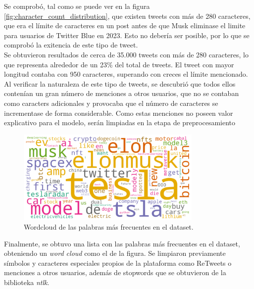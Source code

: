 \documentclass[a4paper, 12pt]{report}
\begin{document}
                        Se comprobó, tal como se puede ver en la figura \ref{fig:character_count_distribution}, 
                        que existen tweets con más de 280 caracteres, que era el límite de caracteres en un post antes de que Musk
                        eliminase el limite para usuarios de Twitter Blue en 2023. Esto no debería ser posible, por lo que se comprobó la exitencia de este tipo de tweet.\\

                        Se obtuvieron resultados de cerca de 35.000 tweets con más de 280 caracteres, lo que representa alrededor de un 23\% del total de tweets.
                        El tweet con mayor longitud contaba con 950 caracteres, superando con creces el límite mencionado. Al verificar la naturaleza de este tipo de tweets,
                        se descubrió que todos ellos contenían un gran número de menciones a otros usuarios, que no se contaban como caracters adicionales y provocaba que el número de caracteres se incrementase de forma considerable. Como 
                        estas menciones no poseen valor explicativo para el modelo, serán limpiadas en la etapa de preprocesamiento\\

                        \begin{figure}[H]
                                \centering
                                \includegraphics[width=0.8\textwidth]{resources/images/word_cloud.png}
                                \caption{Wordcloud de las palabras más frecuentes en el dataset.}
                                \label{fig:wordcloud}
                        \end{figure}

                        Finalmente, se obtuvo una lista con las palabras más frecuentes en el dataset, obteniendo un \textit{word cloud} como el de la figura. Se limpiaron previamente símbolos y caracteres especiales propios de la plataforma como ReTweets o menciones a otros usuarios,
                         además de stopwords que se obtuvieron de la biblioteka \textit{ntlk}.\\
\end{document}
